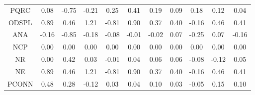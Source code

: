 \documentclass[11pt,a4paper]{report}
\begin{document}
\begin{longtable}{ | c || c | c | c | c | c | c | c | c | c || c |}
PQRC &  \cellcolor[HTML]{FFFFFF} 0.08 &  \cellcolor[HTML]{FFEFEF} -0.75 &  \cellcolor[HTML]{FFF7F7} -0.21 &  \cellcolor[HTML]{F7F7FF} 0.25 &  \cellcolor[HTML]{F7F7FF} 0.41 &  \cellcolor[HTML]{F7F7FF} 0.19 &  \cellcolor[HTML]{FFFFFF} 0.09 &  \cellcolor[HTML]{F7F7FF} 0.18 &  \cellcolor[HTML]{FFFFFF} 0.12 &  \cellcolor[HTML]{FFFFFF} 0.04 \\
ODSPL &  \cellcolor[HTML]{E7E7FF} 0.89 &  \cellcolor[HTML]{F7F7FF} 0.46 &  \cellcolor[HTML]{DFDFFF} 1.21 &  \cellcolor[HTML]{FFE7E7} -0.81 &  \cellcolor[HTML]{E7E7FF} 0.90 &  \cellcolor[HTML]{F7F7FF} 0.37 &  \cellcolor[HTML]{F7F7FF} 0.40 &  \cellcolor[HTML]{FFF7F7} -0.16 &  \cellcolor[HTML]{F7F7FF} 0.46 &  \cellcolor[HTML]{F7F7FF} 0.41 \\
ANA &  \cellcolor[HTML]{FFF7F7} -0.16 &  \cellcolor[HTML]{FFE7E7} -0.85 &  \cellcolor[HTML]{FFF7F7} -0.18 &  \cellcolor[HTML]{FFFFFF} -0.08 &  \cellcolor[HTML]{FFFFFF} -0.01 &  \cellcolor[HTML]{FFFFFF} -0.02 &  \cellcolor[HTML]{FFFFFF} 0.07 &  \cellcolor[HTML]{FFF7F7} -0.25 &  \cellcolor[HTML]{FFFFFF} 0.07 &  \cellcolor[HTML]{FFFFFF} -0.16 \\
NCP &  \cellcolor[HTML]{FFFFFF} 0.00 &  \cellcolor[HTML]{FFFFFF} 0.00 &  \cellcolor[HTML]{FFFFFF} 0.00 &  \cellcolor[HTML]{FFFFFF} 0.00 &  \cellcolor[HTML]{FFFFFF} 0.00 &  \cellcolor[HTML]{FFFFFF} 0.00 &  \cellcolor[HTML]{FFFFFF} 0.00 &  \cellcolor[HTML]{FFFFFF} 0.00 &  \cellcolor[HTML]{FFFFFF} 0.00 &  \cellcolor[HTML]{FFFFFF} 0.00 \\
NR &  \cellcolor[HTML]{FFFFFF} 0.00 &  \cellcolor[HTML]{F7F7FF} 0.42 &  \cellcolor[HTML]{FFFFFF} 0.03 &  \cellcolor[HTML]{FFFFFF} -0.01 &  \cellcolor[HTML]{FFFFFF} 0.04 &  \cellcolor[HTML]{FFFFFF} 0.06 &  \cellcolor[HTML]{FFFFFF} 0.06 &  \cellcolor[HTML]{FFFFFF} -0.08 &  \cellcolor[HTML]{FFFFFF} -0.12 &  \cellcolor[HTML]{FFFFFF} 0.05 \\
NE &  \cellcolor[HTML]{E7E7FF} 0.89 &  \cellcolor[HTML]{F7F7FF} 0.46 &  \cellcolor[HTML]{DFDFFF} 1.21 &  \cellcolor[HTML]{FFE7E7} -0.81 &  \cellcolor[HTML]{E7E7FF} 0.90 &  \cellcolor[HTML]{F7F7FF} 0.37 &  \cellcolor[HTML]{F7F7FF} 0.40 &  \cellcolor[HTML]{FFF7F7} -0.16 &  \cellcolor[HTML]{F7F7FF} 0.46 &  \cellcolor[HTML]{F7F7FF} 0.41 \\
PCONN &  \cellcolor[HTML]{F7F7FF} 0.48 &  \cellcolor[HTML]{F7F7FF} 0.28 &  \cellcolor[HTML]{FFFFFF} -0.12 &  \cellcolor[HTML]{FFFFFF} 0.03 &  \cellcolor[HTML]{FFFFFF} 0.04 &  \cellcolor[HTML]{FFFFFF} 0.10 &  \cellcolor[HTML]{FFFFFF} 0.03 &  \cellcolor[HTML]{FFFFFF} -0.05 &  \cellcolor[HTML]{FFFFFF} 0.15 &  \cellcolor[HTML]{FFFFFF} 0.10 \\

\end{longtable}
\end{document}
